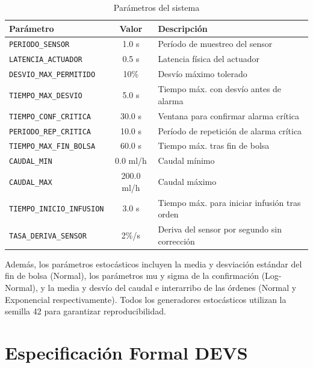 \documentclass[12pt,a4paper]{article}
\begin{document}
\begin{table}[ht]
    \centering
    \caption{Parámetros del sistema}
    \label{tab:parametros}
    \begin{tabularx}{\textwidth}{LcL}
        \toprule
        \textbf{Parámetro} & \textbf{Valor} & \textbf{Descripción} \\
        \midrule
        \texttt{PERIODO\_SENSOR} & 1.0 s & Período de muestreo del sensor \\
        \texttt{LATENCIA\_ACTUADOR} & 0.5 s & Latencia física del actuador \\
        \texttt{DESVIO\_MAX\_PERMITIDO} & 10\% & Desvío máximo tolerado \\
        \texttt{TIEMPO\_MAX\_DESVIO} & 5.0 s & Tiempo máx. con desvío antes de alarma \\
        \texttt{TIEMPO\_CONF\_CRITICA} & 30.0 s & Ventana para confirmar alarma crítica \\
        \texttt{PERIODO\_REP\_CRITICA} & 10.0 s & Período de repetición de alarma crítica \\
        \texttt{TIEMPO\_MAX\_FIN\_BOLSA} & 60.0 s & Tiempo máx. tras fin de bolsa \\
        \texttt{CAUDAL\_MIN} & 0.0 ml/h & Caudal mínimo \\
        \texttt{CAUDAL\_MAX} & 200.0 ml/h & Caudal máximo \\
        \texttt{TIEMPO\_INICIO\_INFUSION} & 3.0 s & Tiempo máx. para iniciar infusión tras orden \\
        \texttt{TASA\_DERIVA\_SENSOR} & 2\%/s & Deriva del sensor por segundo sin corrección \\
        \bottomrule
    \end{tabularx}
\end{table}

Además, los parámetros estocásticos incluyen la media y desviación
estándar del fin de bolsa (Normal), los parámetros mu y sigma de la
confirmación (Log-Normal), y la media y desvío del caudal e interarribo
de las órdenes (Normal y Exponencial respectivamente).  Todos los
generadores estocásticos utilizan la semilla 42 para garantizar
reproducibilidad.

\section{Especificación Formal DEVS}
\end{document}
